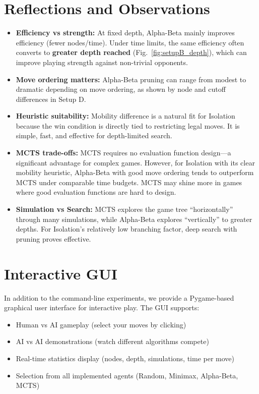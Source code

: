 \documentclass[11pt]{article}
\begin{document}
\section{Reflections and Observations}
\begin{itemize}
  \item \textbf{Efficiency vs strength:} At fixed depth, Alpha-Beta mainly improves efficiency (fewer nodes/time).
  Under time limits, the same efficiency often converts to \textbf{greater depth reached} (Fig.~\ref{fig:setupB_depth}),
  which can improve playing strength against non-trivial opponents.
  
  \item \textbf{Move ordering matters:} Alpha-Beta pruning can range from modest to dramatic depending on move ordering,
  as shown by node and cutoff differences in Setup D.
  
  \item \textbf{Heuristic suitability:} Mobility difference is a natural fit for Isolation because the win condition is
  directly tied to restricting legal moves. It is simple, fast, and effective for depth-limited search.
  
  \item \textbf{MCTS trade-offs:} MCTS requires no evaluation function design---a significant advantage for complex games.
  However, for Isolation with its clear mobility heuristic, Alpha-Beta with good move ordering tends to outperform MCTS
  under comparable time budgets. MCTS may shine more in games where good evaluation functions are hard to design.
  
  \item \textbf{Simulation vs Search:} MCTS explores the game tree ``horizontally'' through many simulations,
  while Alpha-Beta explores ``vertically'' to greater depths. For Isolation's relatively low branching factor,
  deep search with pruning proves effective.
\end{itemize}

\section{Interactive GUI}
In addition to the command-line experiments, we provide a Pygame-based graphical user interface for interactive play.
The GUI supports:
\begin{itemize}
  \item Human vs AI gameplay (select your moves by clicking)
  \item AI vs AI demonstrations (watch different algorithms compete)
  \item Real-time statistics display (nodes, depth, simulations, time per move)
  \item Selection from all implemented agents (Random, Minimax, Alpha-Beta, MCTS)
\end{itemize}
\end{document}
